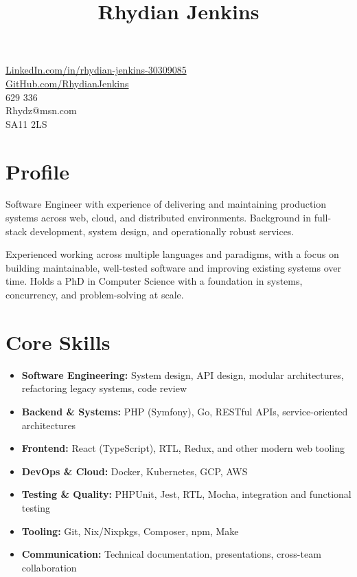 \documentclass[10pt]{article}
\title{\bfseries\Huge Rhydian Jenkins}
\date{}
\author{}
\begin{document}
\maketitle \vspace{-7em}

\section*{}
\faLinkedin \quad \href{https://www.linkedin.com/in/rhydian-jenkins-30309085/}{LinkedIn.com/in/rhydian-jenkins-30309085}\\
\faGithub \quad \href{https://github.com/RhydianJenkins}{GitHub.com/RhydianJenkins}\\
\faPhone {} 629 336\\
\faEnvelope \quad Rhydz@msn.com\\
\faMapMarker \quad SA11 2LS

\section*{Profile}
Software Engineer with experience of delivering and maintaining production systems across web, cloud, and distributed environments. Background in full-stack development, system design, and operationally robust services.

Experienced working across multiple languages and paradigms, with a focus on building maintainable, well-tested software and improving existing systems over time. Holds a PhD in Computer Science with a foundation in systems, concurrency, and problem-solving at scale.

\section*{Core Skills}
\begin{itemize}[noitemsep,topsep=0pt]
    \item \textbf{Software Engineering:} System design, API design, modular architectures, refactoring legacy systems, code review
    \item \textbf{Backend \& Systems:} PHP (Symfony), Go, RESTful APIs, service-oriented architectures
    \item \textbf{Frontend:} React (TypeScript), RTL, Redux, and other modern web tooling
    \item \textbf{DevOps \& Cloud:} Docker, Kubernetes, GCP, AWS
    \item \textbf{Testing \& Quality:} PHPUnit, Jest, RTL, Mocha, integration and functional testing
    \item \textbf{Tooling:} Git, Nix/Nixpkgs, Composer, npm, Make
    \item \textbf{Communication:} Technical documentation, presentations, cross-team collaboration
\end{itemize}
\end{document}
